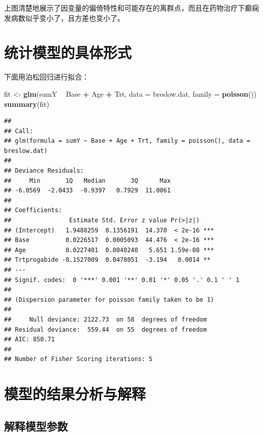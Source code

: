 \documentclass[
]{article}
\newenvironment{Shaded}{\begin{snugshade}}{\end{snugshade}}
\newcommand{\DataTypeTok}[1]{\textcolor[rgb]{0.13,0.29,0.53}{#1}}
\newcommand{\KeywordTok}[1]{\textcolor[rgb]{0.13,0.29,0.53}{\textbf{#1}}}
\newcommand{\NormalTok}[1]{#1}
\newcommand{\OperatorTok}[1]{\textcolor[rgb]{0.81,0.36,0.00}{\textbf{#1}}}
\newcommand{\StringTok}[1]{\textcolor[rgb]{0.31,0.60,0.02}{#1}}
\begin{document}
上图清楚地展示了因变量的偏倚特性和可能存在的离群点，而且在药物治疗下癫痫发病数似乎变小了，且方差也变小了。

\hypertarget{ux7edfux8ba1ux6a21ux578bux7684ux5177ux4f53ux5f62ux5f0f}{%
\section{统计模型的具体形式}\label{ux7edfux8ba1ux6a21ux578bux7684ux5177ux4f53ux5f62ux5f0f}}

下面用泊松回归进行拟合：

\begin{Shaded}
\begin{Highlighting}[]
\NormalTok{fit <-}\StringTok{ }\KeywordTok{glm}\NormalTok{(sumY }\OperatorTok{~}\StringTok{ }\NormalTok{Base }\OperatorTok{+}\StringTok{ }\NormalTok{Age }\OperatorTok{+}\StringTok{ }\NormalTok{Trt, }\DataTypeTok{data =}\NormalTok{ breslow.dat, }
           \DataTypeTok{family =} \KeywordTok{poisson}\NormalTok{())}
\KeywordTok{summary}\NormalTok{(fit)}
\end{Highlighting}
\end{Shaded}

\begin{verbatim}
## 
## Call:
## glm(formula = sumY ~ Base + Age + Trt, family = poisson(), data = breslow.dat)
## 
## Deviance Residuals: 
##     Min       1Q   Median       3Q      Max  
## -6.0569  -2.0433  -0.9397   0.7929  11.0061  
## 
## Coefficients:
##                Estimate Std. Error z value Pr(>|z|)    
## (Intercept)   1.9488259  0.1356191  14.370  < 2e-16 ***
## Base          0.0226517  0.0005093  44.476  < 2e-16 ***
## Age           0.0227401  0.0040240   5.651 1.59e-08 ***
## Trtprogabide -0.1527009  0.0478051  -3.194   0.0014 ** 
## ---
## Signif. codes:  0 '***' 0.001 '**' 0.01 '*' 0.05 '.' 0.1 ' ' 1
## 
## (Dispersion parameter for poisson family taken to be 1)
## 
##     Null deviance: 2122.73  on 58  degrees of freedom
## Residual deviance:  559.44  on 55  degrees of freedom
## AIC: 850.71
## 
## Number of Fisher Scoring iterations: 5
\end{verbatim}

\hypertarget{ux6a21ux578bux7684ux7ed3ux679cux5206ux6790ux4e0eux89e3ux91ca}{%
\section{模型的结果分析与解释}\label{ux6a21ux578bux7684ux7ed3ux679cux5206ux6790ux4e0eux89e3ux91ca}}

\hypertarget{ux89e3ux91caux6a21ux578bux53c2ux6570}{%
\subsection{解释模型参数}\label{ux89e3ux91caux6a21ux578bux53c2ux6570}}
\end{document}

